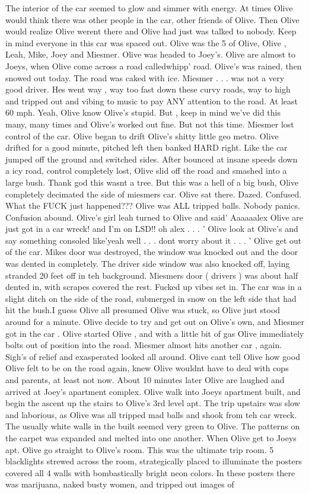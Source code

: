 \documentclass[12pt]{book}
\begin{document}
The interior of the car seemed to glow and simmer with energy. At times Olive would think there was other people in the car, other friends of Olive. Then Olive would realize Olive werent there and Olive had just was talked to nobody. Keep in mind everyone in this car was spaced out. Olive was the 5 of Olive, Olive , Leah, Mike, Joey and Miesmer. Olive was headed to Joey's. Olive are almost to Joeys, when Olive come across a road calledwhipp' road. Olive's was rained, then snowed out today. The road was caked with ice. Miesmer . . .  was not a very good driver. Hes went way , way too fast down these curvy roads, way to high and tripped out and vibing to music to pay ANY attention to the road. At least 60 mph. Yeah, Olive know Olive's stupid. But , keep in mind we've did this many, many times and Olive's worked out fine. But not this time. Miesmer lost control of the car. Olive began to drift Olive's shitty little geo metro. Olive drifted for a good minute, pitched left then banked HARD right. Like the car jumped off the ground and switched sides. After bounced at insane speeds down a icy road, control completely lost, Olive slid off the road and smashed into a large bush. Thank god this wasnt a tree. But this was a hell of a big bush, Olive completely decimated the side of miesmers car. Olive sat there. Dazed. Confused. What the FUCK just happened??? Olive was ALL tripped balls. Nobody panics. Confusion abound. Olive's girl leah turned to Olive and said' Aaaaaalex Olive are just got in a car wreck! and I'm on LSD!! oh alex . . . ' Olive look at Olive's and say something consoled like'yeah well . . .  dont worry about it . . . ' Olive get out of the car. Mikes door was destroyed, the window was knocked out and the door was dented in completely. The driver side window was also knocked off, laying stranded 20 feet off in teh background. Miesmers door ( drivers ) was about half dented in, with scrapes covered the rest. Fucked up vibes set in. The car was in a slight ditch on the side of the road, submerged in snow on the left side that had hit the bush.I guess Olive all presumed Olive was stuck, so Olive just stood around for a minute. Olive decide to try and get out on Olive's own, and Miesmer got in the car . Olive started Olive , and with a little bit of gas Olive immediately bolts out of position into the road. Miesmer almost hits another car , again. Sigh's of relief and exasperated looked all around. Olive cant tell Olive how good Olive felt to be on the road again, knew Olive wouldnt have to deal with cops and parents, at least not now. About 10 minutes later Olive are laughed and arrived at Joey's apartment complex. Olive walk into Joeys apartment built, and begin the ascent up the stairs to Olive's 3rd level apt. The trip upstairs was slow and laborious, as Olive was all tripped mad balls and shook from teh car wreck. The usually white walls in the built seemed very green to Olive. The patterns on the carpet was expanded and melted into one another. When Olive get to Joeys apt. Olive go straight to Olive's room. This was the ultimate trip room. 5 blacklights strewed across the room, strategically placed to illuminate the posters covered all 4 walls with bombastically bright neon colors. In these posters there was marijuana, naked busty women, and tripped out images of 
\end{document}
